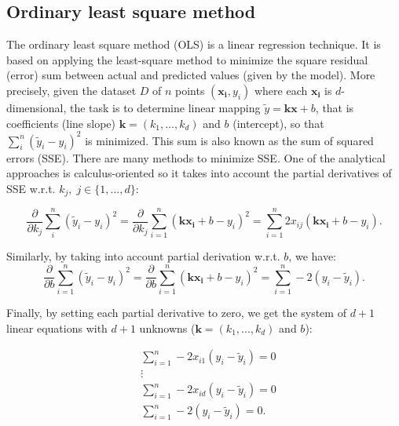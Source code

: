 \documentclass{bmcart}
\begin{document}
\subsection{Ordinary least square method}\label{sec:ols}
The ordinary least square method (OLS) is a linear regression technique. It is based on applying the least-square method to minimize the square residual (error) sum  between actual and predicted values (given by the model). More precisely, given the   dataset $D$ of $n$ points $(\mathbf{x_i}, y_i)$ where each $\mathbf{x_i}$ is $d$-dimensional, the task is to determine linear mapping $\tilde{y} = \mathbf{k} \mathbf{x} + b$, that is coefficients (line slope) $\mathbf{k} = (k_1, \ldots, k_d)$ and $b$ (intercept), so that $ \sum_{i}^{n} (\tilde{y}_i - y_i)^2 $ is minimized. This sum is also known as the sum of squared errors (SSE). There are many methods to minimize SSE. One of the analytical approaches is calculus-oriented so it takes into account the partial derivatives of SSE w.r.t. $k_j,\; j \in \{1, ..., d\}$: 

$$  \frac{\partial}{\partial k_j} \sum_{i}^{n} (\tilde{y}_i - y_i)^2 = \frac{\partial}{\partial k_j} \sum_{i=1}^{n} ( \mathbf{k}\mathbf{x_i}+b  - y_i)^2 =  \sum_{i=1}^{n} 2x_{ij}(\mathbf{k}\mathbf{x_i} + b - y_i).$$ 

Similarly, by taking into account  partial derivation w.r.t. $b$, we have: 
$$  \frac{\partial}{\partial b} \sum_{i=1}^{n} (\tilde{y}_i - y_i)^2  = \frac{\partial}{\partial b} \sum_{i=1}^{n} ( \mathbf{k}\mathbf{x_i}+b  - y_i)^2 = \sum_{i=1}^{n} -2  (y_i - \tilde{y}_i). $$

Finally, by setting each partial derivative to zero, we get the system of $d+1$ linear equations with $d+1$ unknowns ($\mathbf{k}=(k_1, ..., k_d)$ and $b$): 
 
 \begin{align*}
	& \sum_{i=1}^{n} -2x_{i1} (y_i - \tilde{y}_i) = 0 \\
	& \vdots \\
	& \sum_{i=1}^{n} -2x_{id} (y_i - \tilde{y}_i) = 0 \\
	&\sum_{i=1}^{n} -2  (y_i - \tilde{y}_i) = 0.
\end{align*} 
\end{document}

